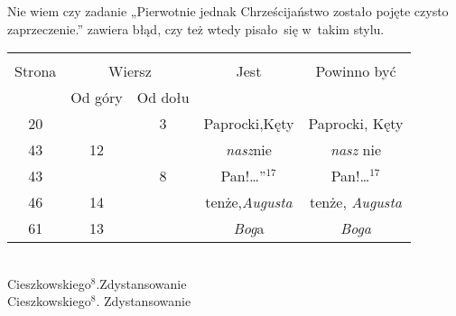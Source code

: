 \documentclass[a4paper,11pt]{article}
\begin{document}

\vspace{0em}


\noindent
{} Nie wiem czy zadanie „Pierwotnie jednak
Chrześcijaństwo zostało pojęte czysto zaprzeczenie.” zawiera błąd,
czy też wtedy pisało~się w~takim stylu.

\vspace{\spaceFour}










\newpage



\begin{center}

  \begin{tabular}{|c|c|c|c|c|}
    \hline
    & \multicolumn{2}{c|}{} & & \\
    Strona & \multicolumn{2}{c|}{Wiersz} & Jest
                              & Powinno być \\ \cline{2-3}
    & Od góry & Od dołu & & \\
    \hline
    20  & &  3 & Paprocki,Kęty & Paprocki, Kęty \\
    43  & 12 & & \textit{nasz}nie & \textit{nasz} nie \\
    43  & &  8 & Pan!\ldots”$^{ 17 }$ & Pan!\ldots$^{ 17 }$ \\
    46  & 14 & & tenże,\textit{Augusta} & tenże, \textit{Augusta} \\
    61  & 13 & & \textit{Bog}a & \textit{Boga} \\
    \hline
  \end{tabular}

\end{center}

\vspace{\spaceTwo}


\noindent
{} \\
\Jest  Cieszkowskiego$^{ 8 }$.Zdystansowanie \\
\Powin Cieszkowskiego$^{ 8 }$. Zdystansowanie \\
\end{document}
